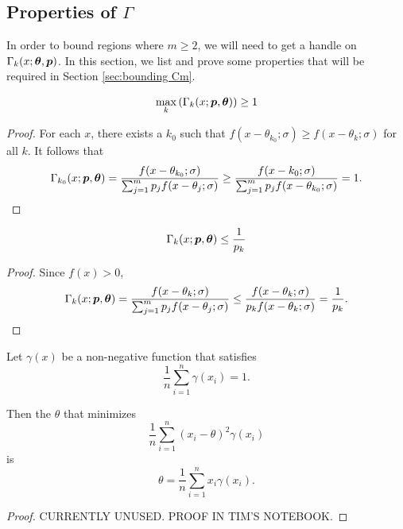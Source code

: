	\subsection{Properties of \texorpdfstring{$\Gamma$}{Gamma}}
		In order to bound regions where $m \geq 2$, we will need to get a handle on $\Gamma_k(x;{\bm{{\theta}}}, {\bm{{p}}})$. In this section, we list and prove some properties that will be required in Section \ref{sec:bounding Cm}.

		\begin{lemma}
		\label{lem:maxkGamma}
			\begin{equation}
				\max_k \left( \Gamma_k(x;{\bm{{p}}},{\bm{{\theta}}}) \right) \geq 1
			\end{equation}
		\end{lemma}	
		\begin{proof}
			For each $x$, there exists a $k_0$ such that $f(x - \theta_{k_0};\sigma) \geq f(x - \theta_k;\sigma)$ for all $k$. It follows that
			\begin{equation}
				\Gamma_{k_0}(x;{\bm{{p}}},{\bm{{\theta}}}) = \frac{f(x - \theta_{k_0};\sigma)}{\sum_{j=1}^m p_j f(x - \theta_j;\sigma)} \geq \frac{f(x - k_0;\sigma)}{\sum_{j=1}^m p_j f(x - \theta_{k_0};\sigma)} = 1.
			\end{equation}
		\end{proof}

		\begin{lemma}
			\begin{equation}
			\Gamma_k(x;{\bm{{p}}},{\bm{{\theta}}}) \leq \frac{1}{p_k}
			\end{equation}
		\end{lemma}
		\begin{proof}
			Since $f(x) > 0$,
			\begin{equation}
				\Gamma_k(x;{\bm{{p}}},{\bm{{\theta}}}) = \frac{f(x - \theta_k;\sigma)}{\sum_{j=1}^m p_j f(x - \theta_j;\sigma)} \leq \frac{f(x - \theta_k;\sigma)}{p_k f(x - \theta_k;\sigma)} = \frac{1}{p_k}.
			\end{equation}
		\end{proof}

		\begin{lemma}
			Let $\gamma(x)$ be a non-negative function that satisfies
			\begin{equation}
				\frac{1}{n} \sum_{i=1}^n \gamma(x_i) = 1.
			\end{equation}

			Then the $\theta$ that minimizes 
			\begin{equation}
				\frac{1}{n} \sum_{i=1}^n (x_i - \theta)^2 \gamma(x_i)
			\end{equation}
			is
			\begin{equation}
				\theta = \frac{1}{n} \sum_{i=1}^n x_i \gamma(x_i).
			\end{equation}
		\end{lemma}
		\begin{proof}
			CURRENTLY UNUSED. PROOF IN TIM'S NOTEBOOK.
		\end{proof}

